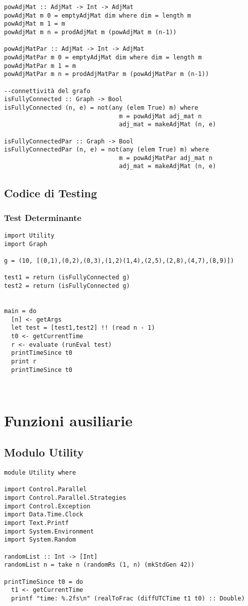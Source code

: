 \begin{verbatim}
powAdjMat :: AdjMat -> Int -> AdjMat
powAdjMat m 0 = emptyAdjMat dim where dim = length m
powAdjMat m 1 = m
powAdjMat m n = prodAdjMat m (powAdjMat m (n-1))

powAdjMatPar :: AdjMat -> Int -> AdjMat
powAdjMatPar m 0 = emptyAdjMat dim where dim = length m
powAdjMatPar m 1 = m
powAdjMatPar m n = prodAdjMatPar m (powAdjMatPar m (n-1))

--connettività del grafo
isFullyConnected :: Graph -> Bool
isFullyConnected (n, e) = not(any (elem True) m) where    
                                m = powAdjMat adj_mat n
                                adj_mat = makeAdjMat (n, e)
                                
isFullyConnectedPar :: Graph -> Bool
isFullyConnectedPar (n, e) = not(any (elem True) m) where    
                                m = powAdjMatPar adj_mat n
                                adj_mat = makeAdjMat (n, e)
\end{verbatim}
\subsection{Codice di Testing}
\subsubsection{Test Determinante}
\begin{verbatim}
import Utility
import Graph

g = (10, [(0,1),(0,2),(0,3),(1,2)(1,4),(2,5),(2,8),(4,7),(8,9)])

test1 = return (isFullyConnected g)
test2 = return (isFullyConnected g)


main = do
  [n] <- getArgs
  let test = [test1,test2] !! (read n - 1)
  t0 <- getCurrentTime
  r <- evaluate (runEval test)
  printTimeSince t0
  print r
  printTimeSince t0
        
        
\end{verbatim}
\section{Funzioni ausiliarie}
\subsection{Modulo Utility}
\begin{verbatim}
module Utility where

import Control.Parallel
import Control.Parallel.Strategies
import Control.Exception
import Data.Time.Clock
import Text.Printf
import System.Environment
import System.Random

randomList :: Int -> [Int]
randomList n = take n (randomRs (1, n) (mkStdGen 42))
                 
printTimeSince t0 = do
  t1 <- getCurrentTime
  printf "time: %.2fs\n" (realToFrac (diffUTCTime t1 t0) :: Double)
\end{verbatim}
